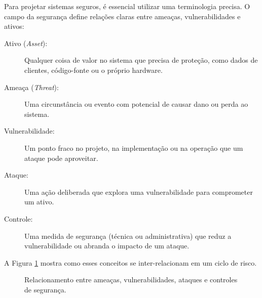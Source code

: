 \documentclass[12pt,a4paper,twoside]{report}
\begin{document}
Para projetar sistemas seguros, é essencial utilizar uma terminologia precisa. O campo da segurança define relações claras entre ameaças, vulnerabilidades e ativos:

\begin{description}
    \item[Ativo (\textit{Asset}):] Qualquer coisa de valor no sistema que precisa de proteção, como dados de clientes, código-fonte ou o próprio hardware.
    \item[Ameaça (\textit{Threat}):] Uma circunstância ou evento com potencial de causar dano ou perda ao sistema.
    \item[Vulnerabilidade:] Um ponto fraco no projeto, na implementação ou na operação que um ataque pode aproveitar.
    \item[Ataque:] Uma ação deliberada que explora uma vulnerabilidade para comprometer um ativo.
    \item[Controle:] Uma medida de segurança (técnica ou administrativa) que reduz a vulnerabilidade ou abranda o impacto de um ataque.
\end{description}

A Figura \ref{fig:relacionamento_seguranca} mostra como esses conceitos se inter-relacionam em um ciclo de risco.

\begin{figure}[h]
    \centering
    \caption{Relacionamento entre ameaças, vulnerabilidades, ataques e controles de segurança.}
    \label{fig:relacionamento_seguranca}
\end{figure}
\end{document}
